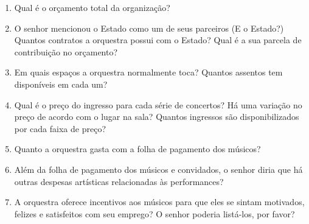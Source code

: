 \documentclass[a4paper, 12pt, openright, oneside, german, french, english, brazil]{abntex2}
\begin{document}
\begin{enumerate}
		\item Qual é o orçamento total da organização?
		
		
		\item O senhor mencionou o Estado como um de seus parceiros (E o Estado?) Quantos contratos a orquestra possui com o Estado? Qual é a sua parcela de contribuição no orçamento?
		
		

		
		\item Em quais espaços a orquestra normalmente toca? Quantos assentos tem disponíveis em cada um?
		
		\item Qual é o preço do ingresso para cada série de concertos? Há uma variação no preço de acordo com o lugar na sala? Quantos ingressos são disponibilizados por cada faixa de preço?
		
		\item Quanto a orquestra gasta com a folha de pagamento dos músicos?
		
		\item Além da folha de pagamento dos músicos e convidados, o senhor diria que há outras despesas artísticas relacionadas às performances?
		
		\item A orquestra oferece incentivos aos músicos para que eles se sintam motivados, felizes e satisfeitos com seu emprego? O senhor poderia listá-los, por favor?
		
	\end{enumerate}
	
\end{document}
